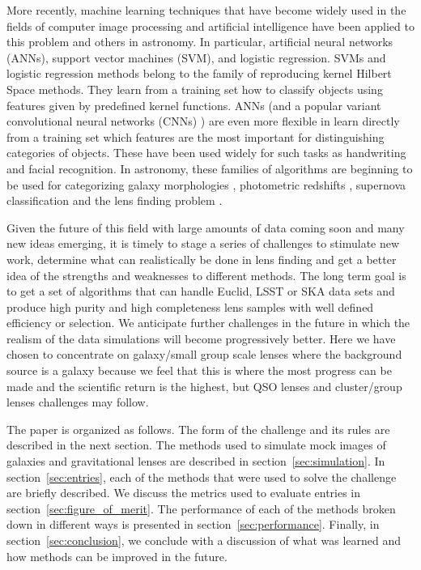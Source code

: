 \documentclass[useAMS,usenatbib]{mnras}
\begin{document}
More recently, machine learning techniques that have become widely used in the fields of computer image processing and artificial intelligence have been applied to this problem and others in astronomy.  In particular, artificial neural networks (ANNs), support vector machines (SVM), and logistic regression.  SVMs and logistic regression methods belong to the family of reproducing kernel Hilbert Space methods. They learn from a training set how to classify objects using features given by predefined kernel functions.  ANNs (and a popular variant convolutional neural networks (CNNs) ) are even more flexible in learn directly from a training set which features are the most important for distinguishing categories of objects.  These have been used widely for such tasks as handwriting and facial recognition.  In astronomy, these families of algorithms are beginning to be used for categorizing galaxy morphologies \citep{2015MNRAS.450.1441D}, photometric redshifts \citep{2017MNRAS.465.1959C,2016PASP..128j4502S,2017NewA...51..169S}, supernova classification \citep{2016ApJS..225...31L} and the lens finding problem \citep{2017MNRAS.471..167J,2017arXiv170207675P,2017MNRAS.465.4325O,2017A&A...597A.135B,hartley2017support}.

Given the future of this field with large amounts of data coming soon and many new ideas emerging, it is timely to stage a series of challenges to stimulate new work, determine what can realistically be done in lens finding and get a better idea of the strengths and weaknesses to different methods.  The long term goal is to get a set of algorithms that can handle Euclid, LSST or SKA data sets and produce high purity and high completeness lens samples with well defined efficiency or selection.  We anticipate further challenges in the future in which the realism of the data simulations will become progressively better.  Here we have chosen to concentrate on galaxy/small group scale lenses where the background source is a galaxy because we feel that this is where the most progress can be made and the scientific return is the highest, but QSO lenses and cluster/group lenses challenges may follow.

The paper is organized as follows.  The form of the challenge and its rules are described in the next section.  The methods used to simulate mock images of galaxies and gravitational lenses are described in section~\ref{sec:simulation}.  In section~\ref{sec:entries}, each of the methods that were used to solve the challenge are briefly described.  We discuss the metrics used to evaluate entries in section~\ref{sec:figure_of_merit}.  The performance of each of the methods broken down in different ways is presented in section~\ref{sec:performance}.  Finally,  in section~\ref{sec:conclusion}, we conclude with a discussion of what was learned and how methods can be improved in the future.
\end{document}
